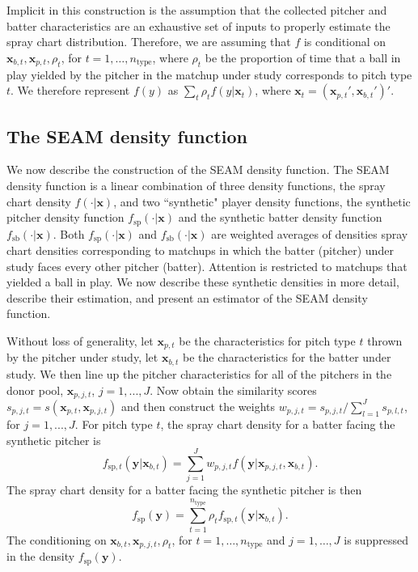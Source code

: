\documentclass[12pt]{article}
\newcommand{\y}{\textbf{y}}
\newcommand{\x}{\textbf{x}}
\begin{document}
Implicit in this construction is the assumption that the collected pitcher and batter characteristics are an exhaustive set of inputs to properly estimate the spray chart distribution. Therefore, we are assuming that $f$ is conditional on $\x_{b,t}, \x_{p,t}, \rho_t$, for $t = 1,\ldots,n_{\text{type}}$, where $\rho_t$ be the proportion of time that a ball in play yielded by the pitcher in the matchup under study corresponds to pitch type $t$. We therefore represent $f(y)$ as $\sum_t \rho_t f(y|\x_t)$, where $\x_t = (\x_{p,t}', \x_{b,t}')'$.


\subsection{The SEAM density function}

We now describe the construction of the SEAM density function. The SEAM density function is a linear combination of three density functions, the spray chart density $f(\cdot|\textbf{x})$, and two ``synthetic" player density functions, the synthetic pitcher density function $f_{\text{sp}}(\cdot|\textbf{x})$ and the synthetic batter density function $f_{\text{sb}}(\cdot|\textbf{x})$. Both $f_{\text{sp}}(\cdot|\textbf{x})$ and $f_{\text{sb}}(\cdot|\textbf{x})$ are weighted averages of densities spray chart densities corresponding to matchups in which the batter (pitcher) under study faces every other pitcher (batter). Attention is restricted to matchups that yielded a ball in play. We now describe these synthetic densities in more detail, describe their estimation, and present an estimator of the SEAM density function.

Without loss of generality, let $\x_{p,t}$ be the characteristics for pitch type $t$ thrown by the pitcher under study, let $\x_{b,t}$ be the characteristics for the batter under study. We then line up the pitcher characteristics for all of the pitchers in the donor pool, $\x_{p,j,t}$, $j = 1,...,J$. Now obtain the similarity scores $s_{p,j,t} = s(\x_{p,t},\x_{p,j,t})$ and then construct the weights $w_{p,j,t} = s_{p,j,t} / \sum_{l=1}^{J}s_{p,l,t}$, for $j = 1,...,J$. For pitch type $t$, the spray chart density for a batter facing the synthetic pitcher is
\begin{equation} \label{synth-pitch-t}
  f_{\text{sp}, t}(\y|\x_{b,t}) = \sum_{j=1}^J w_{p,j,t}f(\y|\x_{p,j,t},\x_{b,t}).
\end{equation}
The spray chart density for a batter facing the synthetic pitcher is then
\begin{equation} \label{synth-pitch}
  f_{\text{sp}}(\y) = \sum_{t=1}^{n_{\text{type}}} \rho_t f_{\text{sp},t}(\y|\x_{b,t}).
\end{equation}
The conditioning on $\x_{b,t}, \x_{p,j,t}, \rho_t$, for $t = 1,\ldots,n_{\text{type}}$ and $j = 1,\ldots,J$ is suppressed in the density $f_{\text{sp}}(\y)$.
\end{document}
